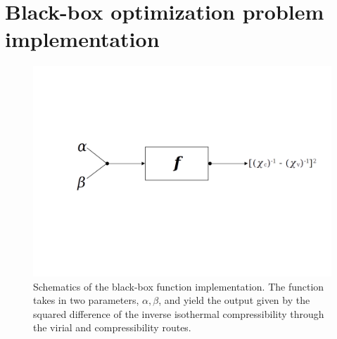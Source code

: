 \section{Black-box optimization problem implementation}
\begin{figure}
    \centering
    \vspace{-2cm}
    \includegraphics[scale=0.3]{figuras/capitulo-5/black-box-function.png}
    \vspace{-3cm}
    \caption{Schematics of the black-box function implementation. The function takes in two parameters, \(\alpha, \beta\), and yield the output given by the squared difference of the inverse isothermal compressibility through the virial and compressibility routes.}
    \label{fig:black-box-function}
\end{figure}

